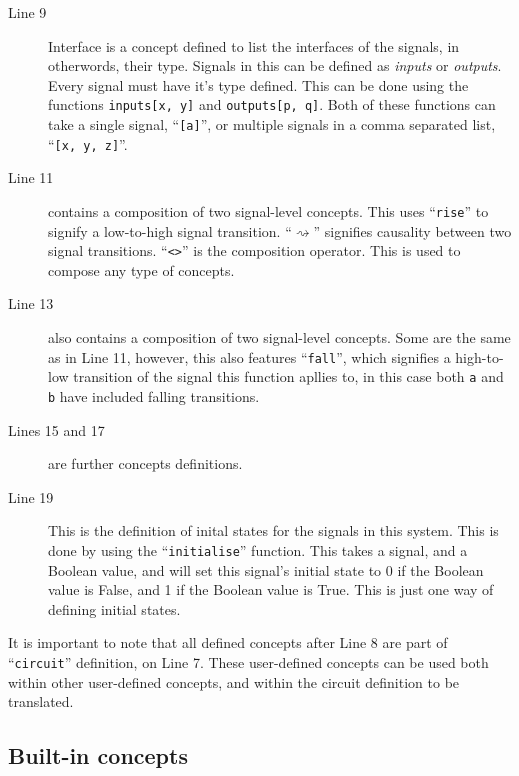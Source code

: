 \documentclass{proc}
\begin{document}
\begin{description}
  \item [Line 9] Interface is a concept defined to list the interfaces of the signals, in otherwords, their type. Signals in this can be defined as \emph{inputs} or \emph{outputs}. Every signal
  must have it's type defined. This can be done using the functions \texttt{inputs[x, y]} and \texttt{outputs[p, q]}. Both of these functions can take a single signal, ``\texttt{[a]}'', or 
  multiple signals in a comma separated list, ``\texttt{[x, y, z]}''.
  
  \item [Line 11] contains a composition of two signal-level concepts. This uses ``\texttt{rise}'' to signify a low-to-high signal transition. ``$\rightsquigarrow$'' signifies causality between two 
  signal transitions. ``\texttt{<>}'' is the composition operator. This is used to compose any type of concepts. 
  
  \item [Line 13] also contains a composition of two signal-level concepts. Some are the same as in Line 11, however, this also features ``\texttt{fall}'', which signifies a high-to-low transition 
  of the signal this function apllies to, in this case both \texttt{a} and \texttt{b} have included falling transitions.
  
  \item [Lines 15 and 17] are further concepts definitions.
  
  \item [Line 19] This is the definition of inital states for the signals in this system. This is done by using the ``\texttt{initialise}'' function. This takes a signal, and a Boolean value, and will set 
  this signal's initial state to 0 if the Boolean value is False, and 1 if the Boolean value is True. This is just one way of defining initial states. 

\end{description}

It is important to note that all defined concepts after Line 8 are part of ``\texttt{circuit}'' definition, on Line 7. These user-defined concepts can be used both within other user-defined 
concepts, and within the circuit definition to be translated. 

\subsection{Built-in concepts \label{sub:built-in_concepts}}
\end{document}
